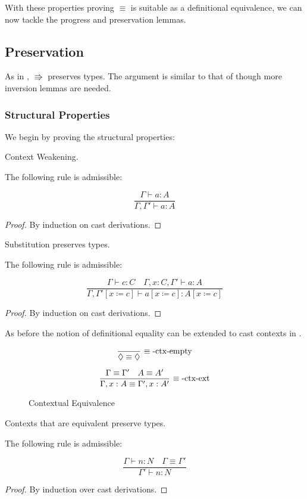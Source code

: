 With these properties proving $\equiv$ is suitable as a definitional equivalence, we can now tackle the progress and preservation lemmas.
 
\subsection{Preservation}
 
As in , $\Rrightarrow$ preserves types.
The argument is similar to that of  though more inversion lemmas are needed.
 
\subsubsection{Structural Properties}
We begin by proving the structural properties:
\begin{lem} Context Weakening.
 
The following rule is admissible:
 
\[
\frac{\Gamma \vdash a:A}{\Gamma ,\Gamma' \vdash a:A}
\]
\end{lem}
 
\begin{proof}
By induction on cast derivations.
\end{proof}

\begin{lem} Substitution preserves types.
 
The following rule is admissible:
 
\[
\frac{\Gamma \vdash c:C \quad \Gamma, x:C, \Gamma' \vdash a:A}{\Gamma, \Gamma' \left[x\coloneqq c\right]\vdash a\left[x\coloneqq c\right]:A\left[x\coloneqq c\right]}
\]
\end{lem}
\begin{proof}
By induction on cast derivations.
\end{proof}

As before the notion of definitional equality can be extended to cast contexts in .
 
\begin{figure}
\[
\frac{\ }{\lozenge\equiv\lozenge}\,\rulename{\ensuremath{\equiv}-ctx-empty}
\]
 
\[
\frac{\Gamma \equiv \Gamma' \quad A\equiv A'}{\Gamma, x:A \equiv \Gamma', x:A'}\,\operatorname{\equiv-ctx-ext}
\]
\caption{Contextual Equivalence}
\label{fig:cast-Context-Equiv}
\end{figure}
 
\begin{lem}Contexts that are equivalent preserve types.
 
The following rule is admissible:
 
\[
\frac{\Gamma\vdash n:N\quad\Gamma\equiv\Gamma'}{\Gamma'\vdash n:N}
\]
\end{lem}
\begin{proof}
By induction over cast derivations.
\end{proof}

